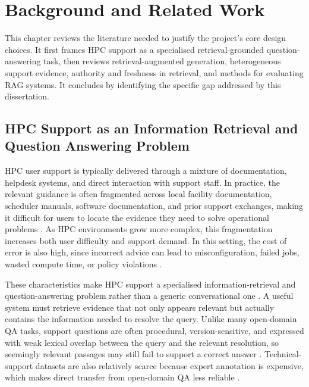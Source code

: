 \chapter{Background and Related Work}
\label{cha:background}

This chapter reviews the literature needed to justify the project's core design choices. It first frames \ac{HPC} support as a specialised retrieval-grounded question-answering task, then reviews retrieval-augmented generation, heterogeneous support evidence, authority and freshness in retrieval, and methods for evaluating \ac{RAG} systems. It concludes by identifying the specific gap addressed by this dissertation. 

\section{HPC Support as an Information Retrieval and Question Answering Problem}
\label{sec:support}

\ac{HPC} user support is typically delivered through a mixture of documentation, helpdesk systems, and direct interaction with support staff. In practice, the relevant guidance is often fragmented across local facility documentation, scheduler manuals, software documentation, and prior support exchanges, making it difficult for users to locate the evidence they need to solve operational problems \citep{AskHPC}. As \ac{HPC} environments grow more complex, this fragmentation increases both user difficulty and support demand. In this setting, the cost of error is also high, since incorrect advice can lead to misconfiguration, failed jobs, wasted compute time, or policy violations \citep{AskHPC}.

These characteristics make \ac{HPC} support a specialised information-retrieval and question-answering problem rather than a generic conversational one \citep{AskHPC,yuTechnicalQuestionAnswering2021}. A useful system must retrieve evidence that not only appears relevant but actually contains the information needed to resolve the query. Unlike many open-domain \ac{QA} tasks, support questions are often procedural, version-sensitive, and expressed with weak lexical overlap between the query and the relevant resolution, so seemingly relevant passages may still fail to support a correct answer \citep{yuTechnicalQuestionAnswering2021,castelliTechQADataset2020}. Technical-support datasets are also relatively scarce because expert annotation is expensive, which makes direct transfer from open-domain \ac{QA} less reliable \citep{yuTechnicalQuestionAnswering2021,castelliTechQADataset2020}.


